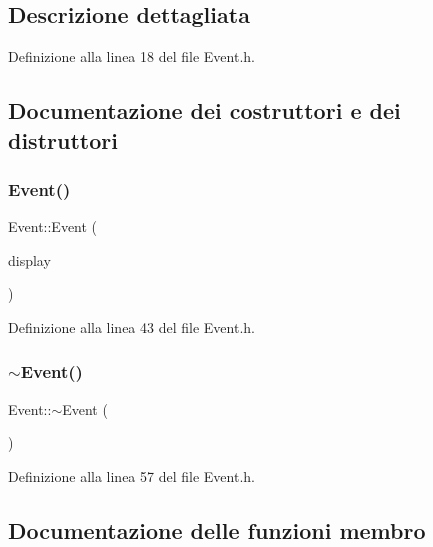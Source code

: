 \subsection{Descrizione dettagliata}


Definizione alla linea 18 del file Event.\+h.



\subsection{Documentazione dei costruttori e dei distruttori}
\mbox{\label{class_event_ab854ceb7d4026d5da229d217a92c20a2}} 
\subsubsection{\texorpdfstring{Event()}{Event()}}
{\footnotesize\ttfamily Event\+::\+Event (\begin{DoxyParamCaption}\item[{A\+L\+L\+E\+G\+R\+O\+\_\+\+D\+I\+S\+P\+L\+AY $\ast$}]{display }\end{DoxyParamCaption})\hspace{0.3cm}{\ttfamily [inline]}}



Definizione alla linea 43 del file Event.\+h.

\mbox{\label{class_event_a7704ec01ce91e673885792054214b3d2}} 
\subsubsection{\texorpdfstring{$\sim$\+Event()}{~Event()}}
{\footnotesize\ttfamily Event\+::$\sim$\+Event (\begin{DoxyParamCaption}{ }\end{DoxyParamCaption})\hspace{0.3cm}{\ttfamily [inline]}}



Definizione alla linea 57 del file Event.\+h.



\subsection{Documentazione delle funzioni membro}
\mbox{\label{class_event_a337e66f37a949969601f8945177cd8b4}} 
